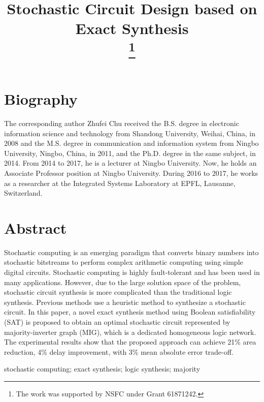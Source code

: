 \documentclass[conference,letterpaper]{IEEEtran}
\begin{document}
\title{Stochastic Circuit Design based on Exact Synthesis\\
\thanks{The work was supported by NSFC under Grant 61871242.}
}

\author{
}

\maketitle

\section*{\textbf{Biography}}
The corresponding author Zhufei Chu received the B.S. degree in electronic information science and technology from Shandong University, Weihai, China, in 2008 and the M.S. degree in communication and information system from Ningbo University, Ningbo, China, in 2011, and the Ph.D. degree in the same subject, in 2014. From 2014 to 2017, he is a lecturer at Ningbo University. Now, he holds an Associate Professor position at Ningbo University. During 2016 to 2017, he works as a researcher at the Integrated Systems Laboratory at EPFL, Lausanne, Switzerland.

\section*{\textbf{Abstract}}
Stochastic computing is an emerging paradigm that converts binary numbers into stochastic bitstreams to perform complex arithmetic computing using simple digital circuits. 
Stochastic computing is highly fault-tolerant and has been used in many applications. 
However, due to the large solution space of the problem, stochastic circuit synthesis is more complicated than the traditional logic synthesis.
Previous methods use a heuristic method to synthesize a stochastic circuit. In this paper, a novel exact synthesis method using Boolean satisfiability (SAT) is proposed to obtain an optimal stochastic circuit represented by majority-inverter graph (MIG), which is a dedicated homogeneous logic network. The experimental results show that the proposed approach can achieve 21\% area reduction, 4\% delay improvement, with 3\% mean absolute error trade-off.  
\vspace{2ex}

\begin{IEEEkeywords}
stochastic computing; exact synthesis; logic synthesis; majority
\end{IEEEkeywords}
\end{document}

